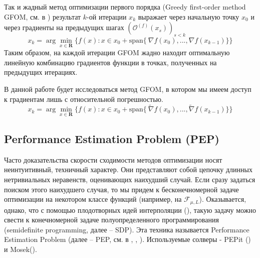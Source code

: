 \documentclass{article}
\begin{document}
Так и жадный метод оптимизации первого порядка (Greedy first-order method GFOM, см. в \cite{drori2020efficient}) результат $k$-ой итерации $x_k$ выражает через начальную точку $x_0$ и через градиенты на предыдущих шагах $(\mathcal{O}^{(f)}(x_s))_{s < k}$
\[x_k = \arg\min_{x \in \mathbf{R}}\{f(x): x \in x_0 + \text{span}\{\ \nabla f(x_0), ..., \nabla f(x_{k-1})\}\} \tag{GFOM}\]
Таким образом, на каждой итерации GFOM жадно находит оптимальную линейную комбинацию градиентов функции в точках, полученных на предыдущих итерациях.

В данной работе будет исследоваться метод GFOM, в котором мы имеем доступ к градиентам лишь с относительной погрешностью.
\[x_k = \arg\min_{x \in \mathbf{R}}\{f(x): x \in x_0 + \text{span}\{\ \widetilde{\nabla} f(x_0), ..., \widetilde{\nabla} f(x_{k-1})\}\} \tag{NoisyGFOM}\]


\subsection{Performance Estimation Problem (PEP)}


Часто доказательства скорости сходимости методов оптимизации носят неинтуитивный, техничный характер. Они представляют собой цепочку длинных нетривиальных неравенств, оценивающих наихудший случай. Если сразу задаться поиском этого наихудшего случая, то мы придем к бесконечномерной задаче оптимизации на некотором классе функций (например, на $\mathcal{F}_{\mu, L}$). Оказывается, однако, что с помощью плодотворных идей интерполяции (\cite{taylor2017smooth}), такую задачу можно свести к конечномерной задаче полуопределенного программирования (semidefinite programming, далее -- SDP). Эта техника называется Performance Estimation Problem (далее -- PEP, см. в \cite{goujaud2022pepit}, \cite{taylor2017smooth}, \cite{taylor2017convex}). Используемые солверы - PEPit (\cite{goujaud2022pepit}) и Mosek(\cite{aps2019mosek}).
\end{document}
